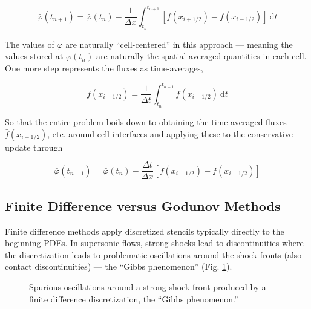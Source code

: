 \documentclass[notoc]{tufte-handout}
\begin{document}
\begin{equation}
\bar{\varphi}(t_{n+1}) = \bar{\varphi}(t_n) - \frac{1}{\Delta x}\int_{t_n}^{t_{n+1}} \left[ f(x_{i+1/2}) - f(x_{i-1/2}) \right]~\mathrm{d}t
\end{equation}

The values of $\varphi$ are naturally ``cell-centered'' in this approach --- meaning the values stored at $\varphi(t_n)$ are naturally the spatial averaged quantities in each cell. One more step represents the fluxes as time-averages,

\begin{equation}
\bar{f}(x_{i-1/2}) = \frac{1}{\Delta t}\int_{t_n}^{t_{n+1}} f(x_{i-1/2})~\mathrm{d}t
\label{eqn:tavgflux}
\end{equation}

So that the entire problem boils down to obtaining the time-averaged fluxes $\bar{f}(x_{i-1/2})$, etc. around cell interfaces and applying these to the conservative update through

\begin{equation}
\boxed{ \bar{\varphi}(t_{n+1}) = \bar{\varphi}(t_n) - \frac{\Delta t}{\Delta x}\left[ \bar{f}(x_{i+1/2}) - \bar{f}(x_{i-1/2}) \right] }
\label{eqn:update}
\end{equation}

\subsection{Finite Difference versus Godunov Methods}

Finite difference methods apply discretized stencils typically directly to the beginning PDEs. In supersonic flows, strong shocks lead to discontinuities where the discretization leads to problematic oscillations around the shock fronts (also contact discontinuities) --- the ``Gibbs phenomenon'' (Fig. \ref{fig:gibbs}).

\begin{figure}[htbp]
\centering
{}
\caption{Spurious oscillations around a strong shock front produced by a finite difference discretization, the ``Gibbs phenomenon.''}
\label{fig:gibbs}
\end{figure}
\end{document}

